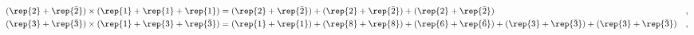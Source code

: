 \begin{equation}
\begin{aligned}
   (\rep{2}+\rep{\bar{2}}) &\times (\rep{1}+\rep{1}+\rep{1})
       = (\rep{2}+\rep{\bar{2}}) + (\rep{2}+\rep{\bar{2}})
          + (\rep{2}+\rep{\bar{2}}) &&, \\
   (\rep{3}+\rep{\bar{3}}) &\times (\rep{1}+\rep{3}+\rep{\bar{3}}) 
       = (\rep{1}+\rep{1}) + (\rep{8}+\rep{8})
          + (\rep{6}+\rep{\bar{6}}) + (\rep{3}+\rep{\bar{3}})
          + (\rep{3}+\rep{\bar{3}}) &&,  
\end{aligned}
\end{equation}

